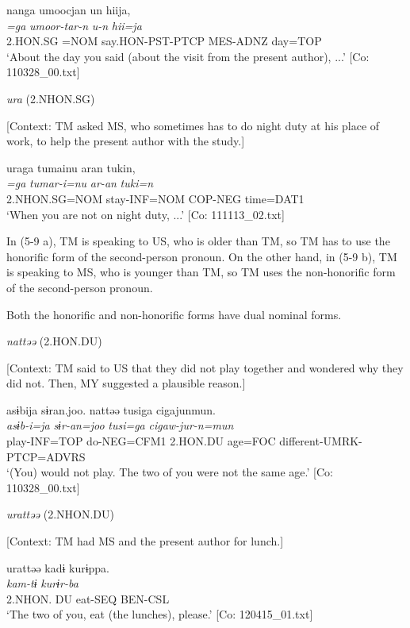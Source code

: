 \glll  nanga  umoocjan  un  hiija,\\
\textit{=ga}  \textit{umoor-tar-n}  \textit{u-n}  \textit{hii=ja}\\
2.HON.SG =NOM  say.HON-PST-PTCP  MES-ADNZ  day=TOP\\
\glt ‘About the day you said (about the visit from the present author), ...’ [Co: 110328\_00.txt]

 \ex \label{ex:5:b} \textit{ura} (2.NHON.SG)

    [Context: TM asked MS, who sometimes has to do night duty at his place of work, to help the present author with the study.]

\glll  uraga  tumainu  aran  tukin,\\
\textit{=ga}  \textit{tumar-i=nu}  \textit{ar-an}  \textit{tuki=n}\\
2.NHON.SG=NOM  stay-INF=NOM  COP-NEG  time=DAT1\\
\glt ‘When you are not on night duty, ...’ [Co: 111113\_02.txt]
\z
\z

In (5-9 a), TM is speaking to US, who is older than TM, so TM has to use the honorific form of the second-person pronoun. On the other hand, in (5-9 b), TM is speaking to MS, who is younger than TM, so TM uses the non-honorific form of the second-person pronoun.

  Both the honorific and non-honorific forms have dual nominal forms.

\ea \label{ex:5:10}  \ea \label{ex:5:10a} \textit{nattəə} (2.HON.DU)

    [Context: TM said to US that they did not play together and wondered why they did not. Then, MY suggested a plausible reason.]

\glll  asɨbija  sɨran.joo.  nattəə  tusiga   cigajunmun.\\
\textit{asɨb-i=ja}  \textit{sɨr-an=joo}  \textit{}  \textit{tusi=ga}  \textit{cigaw-jur-n=mun}\\
play-INF=TOP  do-NEG=CFM1  2.HON.DU  age=FOC  different-UMRK-PTCP=ADVRS\\
\glt ‘(You) would not play. The two of you were not the same age.’ [Co: 110328\_00.txt]

 \ex \label{ex:5:b} \textit{urattəə} (2.NHON.DU)

    [Context: TM had MS and the present author for lunch.]

\glll  urattəə  kadɨ  kurɨppa.\\
\textit{}  \textit{kam-tɨ}  \textit{kurɨr-ba}\\
2.NHON. DU  eat-SEQ  BEN-CSL\\
\glt ‘The two of you, eat (the lunches), please.’ [Co: 120415\_01.txt]
\z
\z

